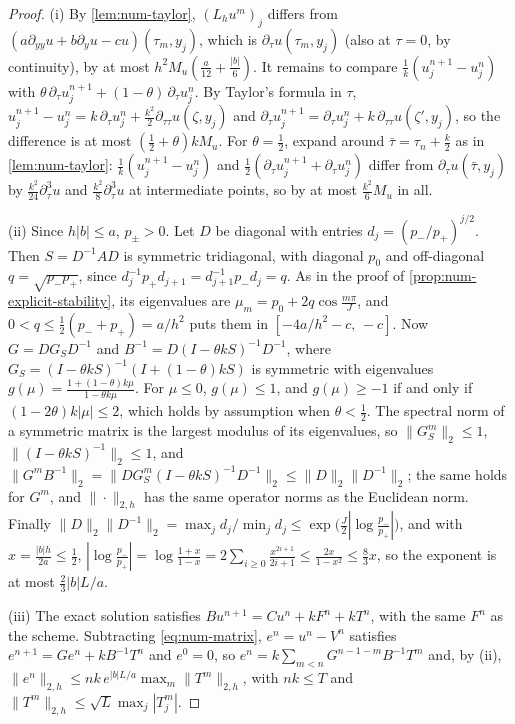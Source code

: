 \begin{proof}
(i) By \cref{lem:num-taylor}, $(L_hu^m)_j$ differs from $(a\partial_{yy}u+b\partial_yu-cu)(\tau_m,y_j)$, which is
$\partial_\tau u(\tau_m,y_j)$ (also at $\tau=0$, by continuity), by at most $h^2M_u(\frac a{12}+\frac{|b|}6)$. It
remains to compare $\frac1k(u^{n+1}_j-u^n_j)$ with $\theta\,\partial_\tau u^{n+1}_j+(1-\theta)\,\partial_\tau u^n_j$. By
Taylor's formula in $\tau$, $u^{n+1}_j-u^n_j=k\,\partial_\tau u^n_j+\frac{k^2}2\partial_{\tau\tau}u(\zeta,y_j)$ and
$\partial_\tau u^{n+1}_j=\partial_\tau u^n_j+k\,\partial_{\tau\tau}u(\zeta',y_j)$, so the difference is at most
$(\frac12+\theta)kM_u$. For $\theta=\frac12$, expand around $\bar\tau=\tau_n+\frac k2$ as in \cref{lem:num-taylor}:
$\frac1k(u^{n+1}_j-u^n_j)$ and $\frac12(\partial_\tau u^{n+1}_j+\partial_\tau u^n_j)$ differ from $\partial_\tau u(\bar\tau,y_j)$ by
$\frac{k^2}{24}\partial^3_\tau u$ and $\frac{k^2}8\partial^3_\tau u$ at intermediate points, so by at most $\frac{k^2}6M_u$ in all.

(ii) Since $h|b|\le a$, $p_\pm>0$. Let $D$ be diagonal with entries $d_j=(p_-/p_+)^{j/2}$. Then $S=D^{-1}AD$
is symmetric tridiagonal, with diagonal $p_0$ and off-diagonal $q=\sqrt{p_-p_+}$, since
$d_j^{-1}p_+d_{j+1}=d_{j+1}^{-1}p_-d_j=q$. As in the proof of \cref{prop:num-explicit-stability}, its
eigenvalues are $\mu_m=p_0+2q\cos\frac{m\pi}J$, and $0<q\le\frac12(p_-+p_+)=a/h^2$ puts them in
$[-4a/h^2-c,\,-c]$. Now $G=DG_SD^{-1}$ and $B^{-1}=D(I-\theta kS)^{-1}D^{-1}$, where
$G_S=(I-\theta kS)^{-1}(I+(1-\theta)kS)$ is symmetric with eigenvalues $g(\mu)=\frac{1+(1-\theta)k\mu}{1-\theta k\mu}$.
For $\mu\le0$, $g(\mu)\le1$, and $g(\mu)\ge-1$ if and only if $(1-2\theta)k|\mu|\le2$, which holds by assumption
when $\theta<\frac12$. The spectral norm of a symmetric matrix is the largest modulus of its eigenvalues,
so $\|G_S^m\|_2\le1$, $\|(I-\theta kS)^{-1}\|_2\le1$, and
$\|G^mB^{-1}\|_2=\|DG_S^m(I-\theta kS)^{-1}D^{-1}\|_2\le\|D\|_2\|D^{-1}\|_2$; the same holds for $G^m$, and
$\|\cdot\|_{2,h}$ has the same operator norms as the Euclidean norm. Finally
$\|D\|_2\|D^{-1}\|_2=\max_jd_j/\min_jd_j\le\exp\big(\frac J2|\log\frac{p_-}{p_+}|\big)$, and with
$x=\frac{|b|h}{2a}\le\frac12$, $|\log\frac{p_-}{p_+}|=\log\frac{1+x}{1-x}=2\sum_{i\ge0}\frac{x^{2i+1}}{2i+1}\le\frac{2x}{1-x^2}\le\frac83x$,
so the exponent is at most $\frac23|b|L/a$.

(iii) The exact solution satisfies $Bu^{n+1}=Cu^n+kF^n+kT^n$, with the same $F^n$ as the scheme.
Subtracting \eqref{eq:num-matrix}, $e^n=u^n-V^n$ satisfies $e^{n+1}=Ge^n+kB^{-1}T^n$ and $e^0=0$, so
$e^n=k\sum_{m<n}G^{n-1-m}B^{-1}T^m$ and, by (ii), $\|e^n\|_{2,h}\le nk\,e^{|b|L/a}\max_m\|T^m\|_{2,h}$, with
$nk\le T$ and $\|T^m\|_{2,h}\le\sqrt L\max_j|T^m_j|$.


\end{proof}
